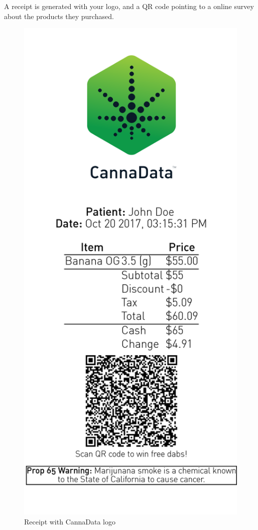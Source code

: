 \documentclass[]{book}
\theoremstyle{definition}
\theoremstyle{definition}
\theoremstyle{definition}
\theoremstyle{remark}
\begin{document}
A receipt is generated with your logo, and a QR code pointing to a
online survey about the products they purchased.

\begin{figure}
\centering
\includegraphics{images/receipt.png}
\caption{Receipt with CannaData logo}
\end{figure}
\end{document}
